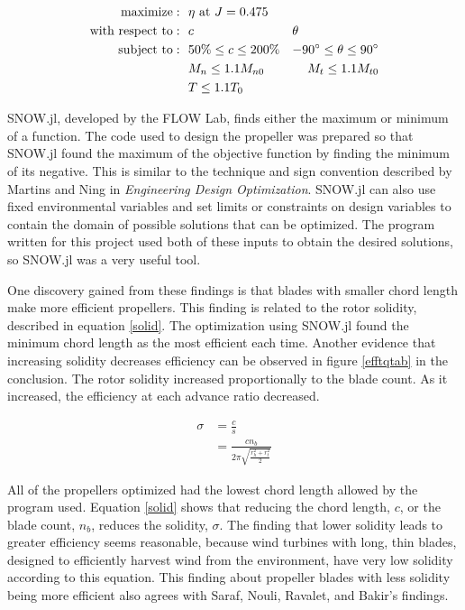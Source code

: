 \documentclass[journal ]{new-aiaa}
\begin{document}
\begin{equation}
	\begin{aligned}
		\mathrm{maximize:}& ~~ \eta ~ \text{at} ~ J = 0.475 \\
		\mathrm{with~respect~to:}& ~~ c & \multicolumn{1}{l}{$\theta$} \\
		\mathrm{subject~to:}& ~~ 50\% \leq c \leq 200\% & -90^{\circ} \leq \theta \leq 90^{\circ} \\
		& ~~ M_{n} \leq 1.1 M_{n0} & M_{t} \leq 1.1 M_{t0} \\
		& ~~ T \leq 1.1 T_{0} \\
	\end{aligned}
	\label{optimization}
\end{equation}

SNOW.jl, developed by the FLOW Lab, finds either the maximum or minimum of a function. The code used to design the propeller was prepared so that SNOW.jl found the maximum of the objective function by finding the minimum of its negative. This is similar to the technique and sign convention described by Martins and Ning in \emph{Engineering Design Optimization}\cite{EngDesOpt}. SNOW.jl can also use fixed environmental variables and set limits or constraints on design variables to contain the domain of possible solutions that can be optimized. The program written for this project used both of these inputs to obtain the desired solutions, so SNOW.jl was a very useful tool.

One discovery gained from these findings is that blades with smaller chord length make more efficient propellers. This finding is related to the rotor solidity, described in equation \eqref{solid}. The optimization using SNOW.jl found the minimum chord length as the most efficient each time. Another evidence that increasing solidity decreases efficiency can be observed in figure \eqref{efftqtab} in the conclusion. The rotor solidity increased proportionally to the blade count. As it increased, the efficiency at each advance ratio decreased.

\begin{equation}
	\begin{aligned}
	\sigma & = \frac{c}{s} \\
	& = \frac{c n_{b}}{2 \pi \sqrt{\frac{r_{h}^{2}+r_{t}^{2}}{2}}}
\end{aligned}
\label{solid}
\end{equation}

All of the propellers optimized had the lowest chord length allowed by the program used. Equation \eqref{solid} shows that reducing the chord length, $c$, or the blade count, $n_{b}$, reduces the solidity, $\sigma$. The finding that lower solidity leads to greater efficiency seems reasonable, because wind turbines with long, thin blades, designed to efficiently harvest wind from the environment, have very low solidity according to this equation. This finding about propeller blades with less solidity being more efficient also agrees with Saraf, Nouli, Ravalet, and Bakir's findings\cite{AxFlFan}.
\end{document}

